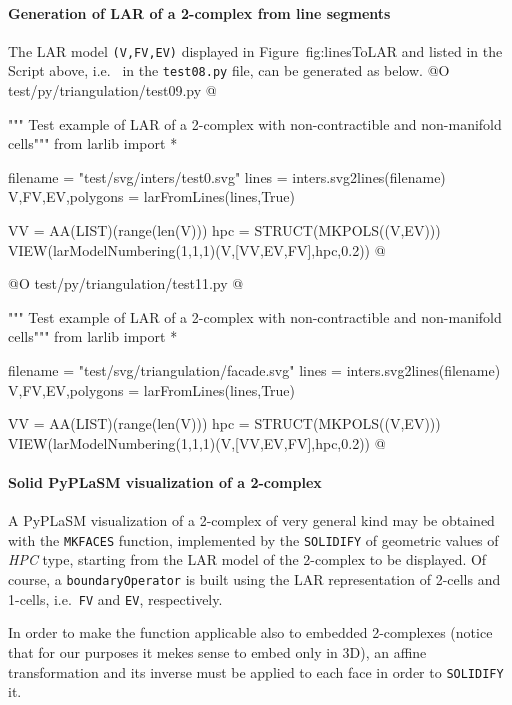 \documentclass[11pt,oneside]{article}    %
\begin{document}
\paragraph{Generation of LAR of a 2-complex from line segments}
The LAR model \texttt{(V,FV,EV)} displayed in Figure~fig:linesToLAR and listed in the Script above, 
i.e.~ in the \texttt{test08.py} file, can be generated as below.
@O test/py/triangulation/test09.py
@{""" Test example of LAR of a 2-complex with non-contractible and non-manifold cells"""
from larlib import *

filename = "test/svg/inters/test0.svg"
lines = inters.svg2lines(filename)
V,FV,EV,polygons = larFromLines(lines,True)

VV = AA(LIST)(range(len(V)))
hpc = STRUCT(MKPOLS((V,EV)))        
VIEW(larModelNumbering(1,1,1)(V,[VV,EV,FV],hpc,0.2)) 
@}

@O test/py/triangulation/test11.py
@{""" Test example of LAR of a 2-complex with non-contractible and non-manifold cells"""
from larlib import *

filename = "test/svg/triangulation/facade.svg"
lines = inters.svg2lines(filename)
V,FV,EV,polygons = larFromLines(lines,True)

VV = AA(LIST)(range(len(V)))
hpc = STRUCT(MKPOLS((V,EV)))        
VIEW(larModelNumbering(1,1,1)(V,[VV,EV,FV],hpc,0.2)) 
@}


\paragraph{Solid PyPLaSM visualization of a 2-complex}

A PyPLaSM visualization of a 2-complex of very general kind may be obtained with the \texttt{MKFACES} function, implemented by the \texttt{SOLIDIFY} of geometric values of \emph{HPC} type, starting from the LAR model of the 2-complex to be displayed. Of course, a \texttt{boundaryOperator} is built using the LAR representation of 2-cells and 1-cells, i.e.~\texttt{FV} and \texttt{EV}, respectively.

In order to make the function applicable also to embedded 2-complexes (notice that for our purposes it mekes sense to embed only in 3D), an affine transformation and its inverse must be applied to each face in order to \texttt{SOLIDIFY} it.
\end{document}
